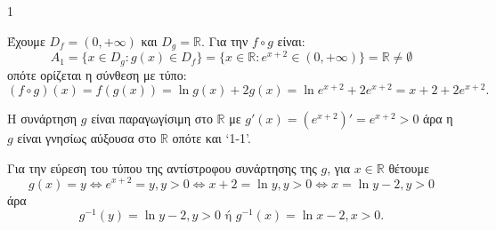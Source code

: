 \begin{ylh}{1}
    \item [Ύλη από εικόνα]
\end{ylh}
\begin{alist}
    \item Έχουμε $D_f = (0,+\infty)$ και $D_g = \mathbb{R}$. Για την $f \circ g$ είναι:
    \[ A_1 = \{x \in D_g : g(x) \in D_f\} = \{x \in \mathbb{R} : e^{x+2} \in (0,+\infty)\} = \mathbb{R} \neq \emptyset \]
    οπότε ορίζεται η σύνθεση με τύπο:
    \[ (f \circ g)(x) = f(g(x)) = \ln g(x) + 2g(x) = \ln e^{x+2} + 2e^{x+2} = x+2+2e^{x+2}. \]
    \item Η συνάρτηση $g$ είναι παραγωγίσιμη στο $\mathbb{R}$ με $g'(x) = (e^{x+2})' = e^{x+2} > 0$ άρα η $g$ είναι γνησίως αύξουσα στο $\mathbb{R}$ οπότε και ‘1-1’.
    \item Για την εύρεση του τύπου της αντίστροφου συνάρτησης της $g$, για $x \in \mathbb{R}$ θέτουμε
    \[ g(x) = y \Leftrightarrow e^{x+2} = y, y>0 \Leftrightarrow x+2 = \ln y, y>0 \Leftrightarrow x = \ln y - 2, y>0 \]
    άρα
    \[ g^{-1}(y) = \ln y - 2, y>0 \text{ ή } g^{-1}(x) = \ln x-2, x>0. \]
\end{alist}